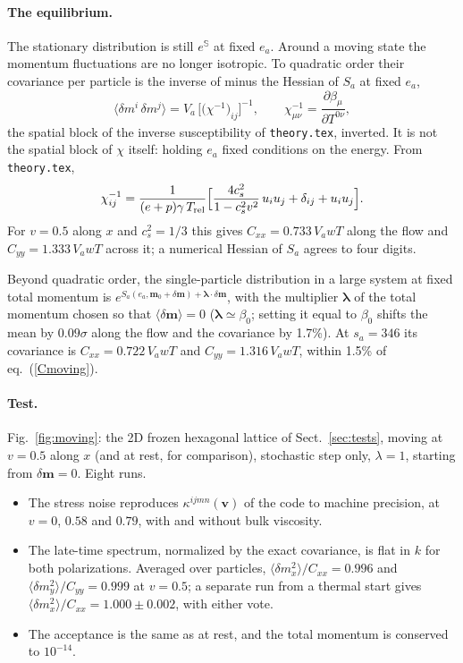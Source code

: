 \documentclass[11pt,aps,preprint,nofootinbib,superscriptaddress,tightenlines]{revtex4-2}
\def\st{\begin{equation}}
\def\stp{\end{equation}}
\def\Eq#1{eq.~(\ref{#1})}
\def\Sect#1{Sect.~\ref{#1}}
\def\Fig#1{Fig.~\ref{#1}}
\newcommand{\avg}[1]{\langle #1\rangle}
\let\oldparagraph\paragraph
\renewcommand{\paragraph}{\par\bigskip\oldparagraph}
\begin{document}
\paragraph{The equilibrium.}  The stationary distribution is still
$e^{\mathbb S}$ at fixed $e_a$.  Around a moving state the momentum fluctuations
are no longer isotropic.  To quadratic order their covariance per particle is
the inverse of minus the Hessian of $S_a$ at fixed $e_a$,
\st
\avg{\delta m^i\,\delta m^j}=V_a\,\Big[\big(\chi^{-1}\big)_{ij}\Big]^{-1},\qquad
\chi^{-1}_{\mu\nu}=\frac{\partial\beta_\mu}{\partial T^{0\nu}} ,
\label{Cmoving}
\stp
the spatial block of the inverse susceptibility of \texttt{theory.tex},
inverted.  It is not the spatial block of $\chi$ itself: holding $e_a$ fixed
conditions on the energy.  From \texttt{theory.tex},
\st
\chi^{-1}_{ij}=\frac{1}{(e+p)\gamma\,T_{\rm rel}}\Big[\frac{4c_s^2}{1-c_s^2v^2}\,u_iu_j+\delta_{ij}+u_iu_j\Big].
\stp
For $v=0.5$ along $x$ and $c_s^2=1/3$ this gives $C_{xx}=0.733\,V_awT$ along the flow
and $C_{yy}=1.333\,V_awT$ across it; a numerical Hessian of $S_a$ agrees to four
digits.

Beyond quadratic order, the single-particle distribution in a large system at
fixed total momentum is $e^{S_a(e_a,\bm m_0+\delta\bm m)+\bm\lambda\cdot\delta\bm m}$, with the
multiplier $\bm\lambda$ of the total momentum chosen so that $\avg{\delta\bm m}=0$
($\bm\lambda\simeq\beta_0$; setting it equal to $\beta_0$ shifts the mean by $0.09\sigma$
along the flow and the covariance by 1.7\%).  At $s_a=346$ its covariance is
$C_{xx}=0.722\,V_awT$ and $C_{yy}=1.316\,V_awT$, within 1.5\% of \Eq{Cmoving}.

\paragraph{Test.}  \Fig{fig:moving}: the 2D frozen hexagonal lattice of
\Sect{sec:tests}, moving at $v=0.5$ along $x$ (and at rest, for comparison),
stochastic step only, $\lambda=1$, starting from $\delta\bm m=0$.  Eight runs.
\begin{itemize}
\item The stress noise reproduces $\kappa^{ijmn}(\bm v)$ of the code to machine
  precision, at $v=0$, $0.58$ and $0.79$, with and without bulk viscosity.
\item The late-time spectrum, normalized by the exact covariance, is flat in
  $k$ for both polarizations.  Averaged over particles, $\avg{\delta m_x^2}/C_{xx}=0.996$
  and $\avg{\delta m_y^2}/C_{yy}=0.999$ at $v=0.5$; a separate run from a thermal
  start gives $\avg{\delta m_x^2}/C_{xx}=1.000\pm0.002$, with either vote.
\item The acceptance is the same as at rest, and the total momentum is
  conserved to $10^{-14}$.
\end{itemize}
\end{document}
